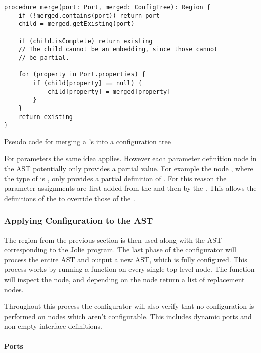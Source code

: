 \begin{listing}[H]
\begin{verbatim}
procedure merge(port: Port, merged: ConfigTree): Region {
    if (!merged.contains(port)) return port
    child = merged.getExisting(port)

    if (child.isComplete) return existing
    // The child cannot be an embedding, since those cannot
    // be partial.

    for (property in Port.properties) {
        if (child[property] == null) {
            child[property] = merged[property]
        }
    }
    return existing
}
\end{verbatim}

\caption{Pseudo code for merging a 's  into a
     configuration tree}

\label{lst:merge_ports}

\end{listing}

For parameters the same idea applies. However each parameter definition node in
the AST potentially only provides a partial value. For example the node
, where the type of  is , only provides a partial definition of . For this reason
    the parameter assignments are first added from the  and then
    by the . This allows the definitions of the  to
    override those of the .

\subsubsection*{Applying Configuration to the AST}

The  region from the previous section is then used along
with the AST corresponding to the Jolie program. The last phase of
the configurator will process the entire AST and output a new AST, which is
fully configured. This process works by running a  function on
every single top-level node. The  function will inspect the node,
and depending on the node return a list of replacement nodes.

Throughout this process the configurator will also verify that no configuration
is performed on nodes which aren't configurable. This includes dynamic ports
and non-empty interface definitions.

\paragraph{Ports}

